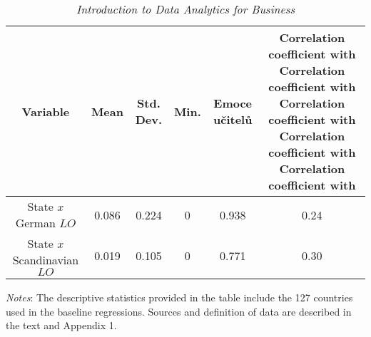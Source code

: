 \begin{landscape}
\begin{table}[htbp]
  \caption{\textit{Introduction to Data Analytics for Business}}\label{tab:tab1}
  \scriptsize
  {
    \centering
    \begin{tabularx}{\linewidth}{CCCCCC}
      \toprule
      Variable &
      Mean&
      Std. Dev.&
      Min.&
      Emoce učitelů &
      Correlation coefficient with Correlation coefficient with Correlation coefficient with Correlation coefficient with Correlation coefficient with  \\
      \midrule
      \midrule
      State $x$ German $LO$ &
      0.086&
      0.224&
      0&
      0.938&
      0.24 \\
      \midrule

      State $x$ Scandinavian $LO$ &
      0.019&
      0.105&
      0&
      0.771&
      0.30 \\
      \bottomrule
    \end{tabularx}

  }
  \smallskip
  \emph{Notes}: The descriptive statistics provided in the table include the 127 countries used in the baseline regressions.
  Sources and definition of data are described in the text and Appendix 1.

\end{table}
\end{landscape}